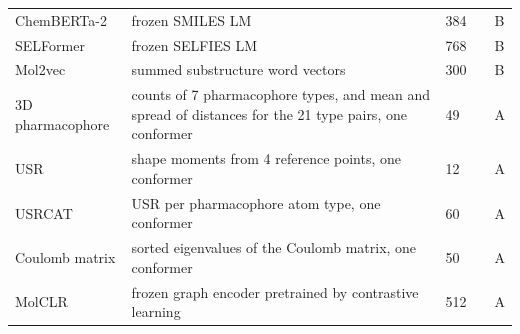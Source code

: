 {\begin{longtable}{P{3.0cm}P{5.0cm}P{1.5cm}P{1.5cm}P{1.4cm}}
ChemBERTa-2 & frozen SMILES LM & 384 & \citep{Ahmad2022} & B \\
SELFormer & frozen SELFIES LM & 768 & \citep{Yuksel2023} & B \\
Mol2vec & summed substructure word vectors & 300 & \citep{Jaeger2018} & B \\
3D pharmacophore & counts of 7 pharmacophore types, and mean and spread of distances for the 21 type pairs, one conformer & 49 & \citep{rdkit} & A \\
USR & shape moments from 4 reference points, one conformer & 12 & \citep{Ballester2007} & A \\
USRCAT & USR per pharmacophore atom type, one conformer & 60 & \citep{Schreyer2012} & A \\
Coulomb matrix & sorted eigenvalues of the Coulomb matrix, one conformer & 50 & \citep{Rupp2012} & A \\

MolCLR & frozen graph encoder pretrained by contrastive learning & 512 & \citep{Wang2022MolCLR} & A \\
\end{longtable}}

